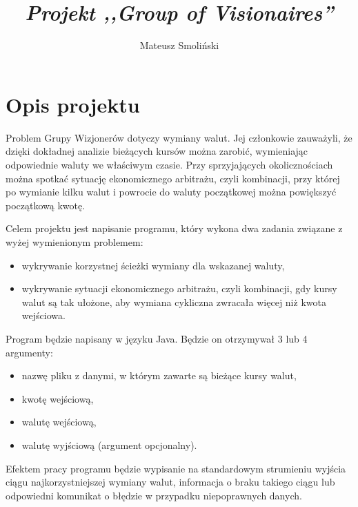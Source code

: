 \documentclass[a4paper,11pt]{article}
\title{ \sc{Specyfikacja funkcjonalna} \\
\emph{Projekt ,,Group of Visionaires''} }
\author{Mateusz Smoliński}
\newcommand\tab[1][0.6cm]{\hspace*{#1}}
\begin{document}
\maketitle


\thispagestyle{empty}

\tableofcontents

\newpage

\section{Opis projektu}

\tab Problem Grupy Wizjonerów dotyczy wymiany walut. Jej członkowie zauważyli, że dzięki dokładnej analizie bieżących kursów można zarobić, wymieniając odpowiednie waluty we właściwym czasie. Przy sprzyjających okolicznościach można spotkać sytuację ekonomicznego arbitrażu, czyli kombinacji, przy której po wymianie kilku walut i powrocie do waluty początkowej można powiększyć początkową kwotę.

Celem projektu jest napisanie programu, który wykona dwa zadania związane z wyżej wymienionym problemem: 

\begin{itemize}
\item wykrywanie korzystnej ścieżki wymiany dla wskazanej waluty,
\item wykrywanie sytuacji ekonomicznego arbitrażu, czyli kombinacji, gdy kursy walut są tak ułożone, aby wymiana cykliczna zwracała więcej niż kwota wejściowa.
\end{itemize}

Program będzie napisany w języku Java. Będzie on otrzymywał 3 lub 4 argumenty:

\begin{itemize}
\item nazwę pliku z danymi, w którym zawarte są bieżące kursy walut,
\item kwotę wejściową,
\item walutę wejściową,
\item walutę wyjściową (argument opcjonalny).
\end{itemize}

Efektem pracy programu będzie wypisanie na standardowym strumieniu wyjścia ciągu najkorzystniejszej wymiany walut, informacja o braku takiego ciągu lub odpowiedni komunikat o błędzie w przypadku niepoprawnych danych.
\end{document}
